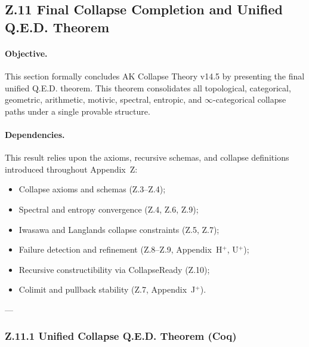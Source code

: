 \documentclass[11pt]{article}
\begin{document}
\subsection*{Z.11 Final Collapse Completion and Unified Q.E.D. Theorem}

\paragraph{Objective.}
This section formally concludes AK Collapse Theory v14.5 by presenting the final unified Q.E.D. theorem. This theorem consolidates all topological, categorical, geometric, arithmetic, motivic, spectral, entropic, and $\infty$-categorical collapse paths under a single provable structure.

\paragraph{Dependencies.}
This result relies upon the axioms, recursive schemas, and collapse definitions introduced throughout Appendix~Z:

\begin{itemize}
    \item Collapse axioms and schemas (Z.3–Z.4);
    \item Spectral and entropy convergence (Z.4, Z.6, Z.9);
    \item Iwasawa and Langlands collapse constraints (Z.5, Z.7);
    \item Failure detection and refinement (Z.8–Z.9, Appendix~H$^+$, U$^+$);
    \item Recursive constructibility via CollapseReady (Z.10);
    \item Colimit and pullback stability (Z.7, Appendix~J$^+$).
\end{itemize}

---

\subsubsection*{Z.11.1 Unified Collapse Q.E.D. Theorem (Coq)}
\end{document}
